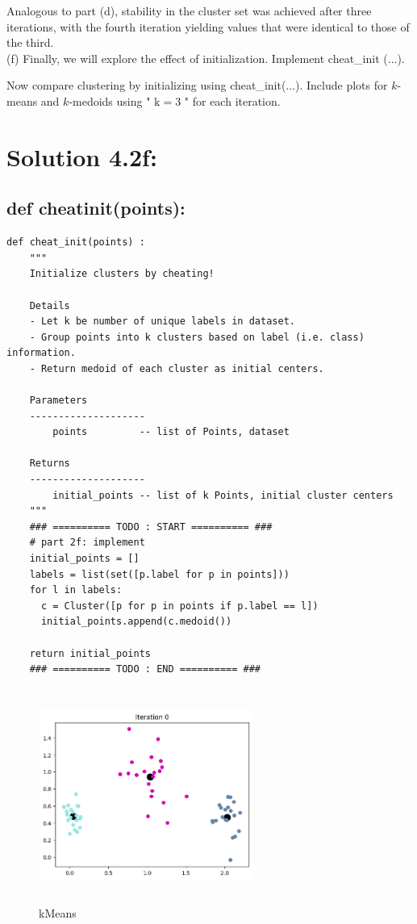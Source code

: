 \documentclass[10pt]{article}
\begin{document}
Analogous to part (d), stability in the cluster set was achieved after three iterations, with the fourth iteration yielding values that were identical to those of the third. \\

(f) Finally, we will explore the effect of initialization. Implement cheat\_init (...).

Now compare clustering by initializing using cheat\_init(...). Include plots for $k$-means and $k$-medoids using " $\mathrm{k}=3$ " for each iteration.

\section*{Solution 4.2f:}

\subsection*{def cheat\textunderscore init(points):}
\begin{verbatim}
def cheat_init(points) :
    """
    Initialize clusters by cheating!

    Details
    - Let k be number of unique labels in dataset.
    - Group points into k clusters based on label (i.e. class) information.
    - Return medoid of each cluster as initial centers.

    Parameters
    --------------------
        points         -- list of Points, dataset

    Returns
    --------------------
        initial_points -- list of k Points, initial cluster centers
    """
    ### ========== TODO : START ========== ###
    # part 2f: implement
    initial_points = []
    labels = list(set([p.label for p in points]))
    for l in labels:
      c = Cluster([p for p in points if p.label == l])
      initial_points.append(c.medoid())

    return initial_points
    ### ========== TODO : END ========== ###
\end{verbatim}

\begin{figure}[H]
  \centering
  \includegraphics[width=7cm, height=7cm]{images/4.2f_Means.png}
  \caption{kMeans}
  \label{fig:Clusters}
\end{figure}
\end{document}
